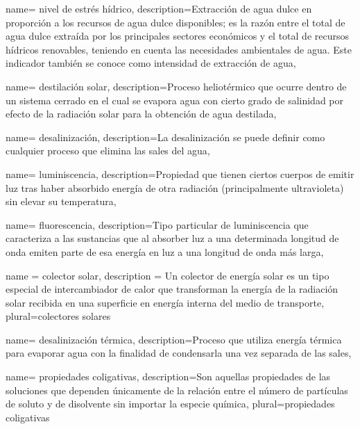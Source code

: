 {
	name= {nivel de estrés hídrico},
	description={Extracción de agua dulce en proporción a los recursos de agua dulce disponibles; es la razón entre el total de agua dulce extraída por los principales sectores económicos y el total de recursos hídricos renovables, teniendo en cuenta las necesidades ambientales de agua. Este indicador también se conoce como intensidad de extracción de agua},
}

{
	name= {destilación solar},
	description={Proceso heliotérmico que ocurre dentro de un sistema cerrado en el cual se evapora agua con cierto grado de salinidad por efecto de la radiación solar para la obtención de agua destilada},
}

{
	name= {desalinización},
	description={La desalinización se puede definir como cualquier proceso que elimina las sales del agua},
}

{
	name= {luminiscencia},
	description={Propiedad que tienen ciertos cuerpos de emitir luz tras haber absorbido energía de otra radiación (principalmente ultravioleta) sin elevar su temperatura},
}

{
	name= {fluorescencia},
	description={Tipo particular de \gls{luminiscencia} que caracteriza a las sustancias que al absorber luz a una determinada longitud de onda emiten parte de esa energía en luz a una longitud de onda más larga},
}

{
	name = {colector solar},
	description = {Un colector de energía solar es un tipo especial de intercambiador de calor que transforman la energía de la radiación solar recibida en una superficie en energía interna del medio de transporte},
	plural={colectores solares}
}

{
	name= {desalinización térmica},
	description={Proceso que utiliza energía térmica para evaporar agua con la finalidad de condensarla una vez separada de las sales},
}

{
	name= {propiedades coligativas},
	description={Son aquellas propiedades de las soluciones que dependen únicamente de la relación entre el número de partículas de soluto y de disolvente sin importar la especie química},
	plural={propiedades coligativas}
}
